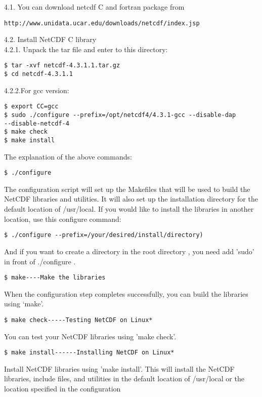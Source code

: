\documentclass[paper=a4, fontsize=11pt]{scrartcl}
\numberwithin{equation}{section}
\numberwithin{figure}{section}
\numberwithin{table}{section}
\begin{document}
\Large{4.1}. You can download netcdf C and fortran package from 
{\color{Brown}\begin{verbatim}
http://www.unidata.ucar.edu/downloads/netcdf/index.jsp
\end{verbatim}}

\Large{4.2}. Install NetCDF C library
\\
\large{4.2.1}. Unpack the tar file and enter to this directory:
\\
{\color{blue}\begin{verbatim}
$ tar -xvf netcdf-4.3.1.1.tar.gz
$ cd netcdf-4.3.1.1
\end{verbatim}}
\large{4.2.2}.For gcc version:
\\
{\color{blue}\begin{verbatim}
$ export CC=gcc
$ sudo ./configure --prefix=/opt/netcdf4/4.3.1-gcc --disable-dap 
--disable-netcdf-4
$ make check
$ make install
\end{verbatim}}
The explanation of the above commands:
{\color{green}\begin{verbatim}
$ ./configure       
 \end{verbatim}}
The configuration script will set up the Makefiles that will be used to build the NetCDF libraries and utilities. 
It will also set up the installation directory for the default location of /usr/local.
If you would like to install the libraries in another location, use this configure command:
{\color{green}\begin{verbatim}
$ ./configure --prefix=/your/desired/install/directory)
\end{verbatim}}
And if you want to create a directory in the root directory , you need add 'sudo' in front of ./configure .
{\color{green}\begin{verbatim}
$ make----Make the libraries
\end{verbatim}}
When the configuration step completes successfully, you can build the libraries using `make'.
{\color{green}\begin{verbatim}
$ make check-----Testing NetCDF on Linux*
\end{verbatim}}
You can test your NetCDF libraries using 'make check'.
{\color{green}\begin{verbatim}
$ make install------Installing NetCDF on Linux*
\end{verbatim}}
Install NetCDF libraries using 'make install'.
 This will install the NetCDF libraries, include files, and utilities in the default location of /usr/local or the location specified in the configuration 
\end{document}
